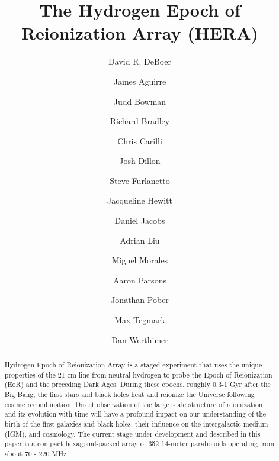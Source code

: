 \documentclass[ars]{copernicus}
\begin{document}
\linenumbers

\title{The Hydrogen Epoch of Reionization Array (HERA)}

\author[1]{David R. DeBoer}
\author[2]{James Aguirre}
\author[3]{Judd Bowman}
\author[4]{Richard Bradley}
\author[4]{Chris Carilli}
\author[5]{Josh Dillon}
\author[6]{Steve Furlanetto}
\author[5]{Jacqueline Hewitt}
\author[3]{Daniel Jacobs}
\author[1]{Adrian Liu}
\author[7]{Miguel Morales}
\author[1]{Aaron Parsons}
\author[7]{Jonathan Pober}
\author[5]{Max Tegmark}
\author[1]{Dan Werthimer}






\received{}
\pubdiscuss{} %
\revised{}
\accepted{}
\published{}




\maketitle 

\begin{abstract}
Hydrogen Epoch of Reionization Array  is a staged
experiment that uses the unique properties of the 21-cm line from neutral
hydrogen to probe the Epoch of Reionization (EoR) and the preceding Dark
Ages. During these epochs, roughly 0.3-1 Gyr after the Big Bang, the first
stars and black holes heat and reionize the Universe following cosmic
recombination. Direct observation of the large scale structure of
reionization and its evolution with time will have
a profound impact on our understanding of the birth of the first galaxies
and black holes, their influence on the intergalactic medium (IGM), and
cosmology.  The current stage under development and described in this paper is a compact hexagonal-packed array of 352 14-meter paraboloids 
operating from about 70 - 220 MHz.
\end{abstract}
\end{document}
